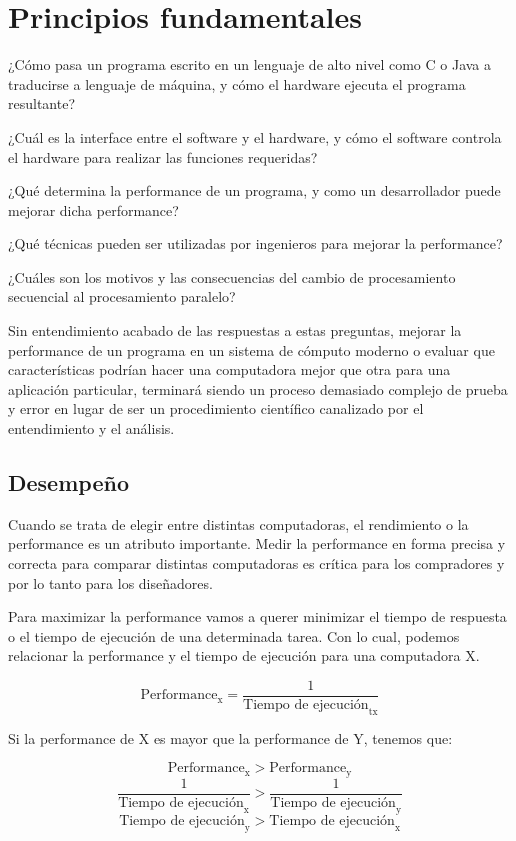\chapter{Principios fundamentales}
¿Cómo pasa un programa escrito en un lenguaje de alto nivel como C o Java a traducirse a lenguaje de máquina, y cómo el hardware ejecuta el programa resultante?

¿Cuál es la interface entre el software y el hardware, y cómo el software controla el hardware para realizar las funciones requeridas?

¿Qué determina la performance de un programa, y como un desarrollador puede mejorar dicha performance?

¿Qué técnicas pueden ser utilizadas por ingenieros para mejorar la performance?

¿Cuáles son los motivos y las consecuencias del cambio de procesamiento secuencial al procesamiento paralelo?

Sin entendimiento acabado de las respuestas a estas preguntas, mejorar la performance de un programa en un sistema de cómputo moderno o evaluar que características podrían hacer una computadora mejor que otra para una aplicación particular, terminará siendo un proceso demasiado complejo de prueba y error en lugar de ser un procedimiento científico canalizado por el entendimiento y el análisis.

\section{Desempeño}
Cuando se trata de elegir entre distintas computadoras, el rendimiento o la performance es un atributo importante. Medir la performance en forma precisa y correcta para comparar distintas computadoras es crítica para los compradores y por lo tanto para los diseñadores.

Para maximizar la performance vamos a querer minimizar el tiempo de respuesta o el tiempo de ejecución de una determinada tarea. Con lo cual, podemos relacionar la performance y el tiempo de ejecución para una computadora X.

\[ \text{Performance}_\text{x} = \frac{1}{\text{Tiempo de ejecución}_\text{tx}} \]

Si la performance de X es mayor que la performance de Y, tenemos que:

\[ \text{Performance}_\text{x} > \text{Performance}_\text{y} \]
\[ \frac{1}{\text{Tiempo de ejecución}_\text{x}} > \frac{1}{\text{Tiempo de ejecución}_\text{y}} \]
\[ \text{Tiempo de ejecución}_\text{y} > \text{Tiempo de ejecución}_\text{x} \]

